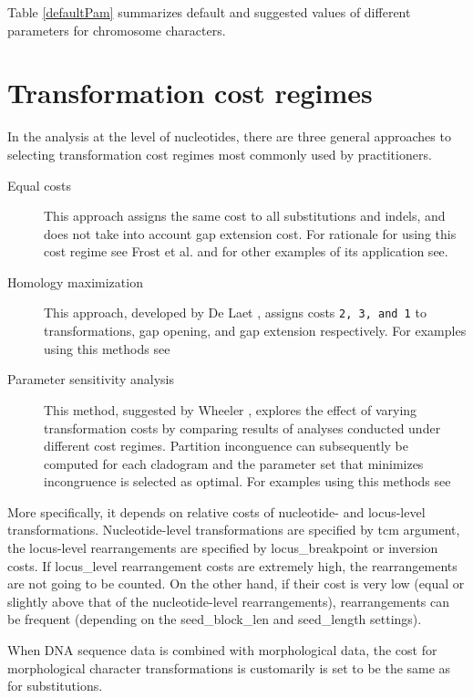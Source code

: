 Table \ref{defaultPam} summarizes default and suggested values of different
parameters for chromosome characters.


\section{Transformation cost regimes}
In the analysis at the level of nucleotides, there are three general approaches to selecting transformation cost regimes most commonly used by \poy practitioners.
\begin{description}
\item[Equal costs] This approach assigns the same cost to all substitutions and indels, and does not take into account gap extension cost. For rationale for using this cost regime see Frost et al. \cite{frost2001} and for other examples of its application see.
\item[Homology maximization] This approach, developed by De Laet \cite{delaet2005}, assigns costs \texttt{2, 3, and 1} to transformations, gap opening, and gap extension respectively. For examples using this methods see
\item[Parameter sensitivity analysis] This method, suggested by Wheeler \cite{wheeler1995}, explores the effect of varying transformation costs by comparing results of analyses conducted under different cost regimes. Partition inconguence can subsequently be computed  for each cladogram and the parameter set that minimizes incongruence is selected as optimal. For examples using this methods see
\end{description}
More specifically, it depends on relative costs of nucleotide- and locus-level transformations. Nucleotide-level transformations are specified by tcm argument, the locus-level rearrangements are specified by locus\_breakpoint or inversion costs. If locus\_level rearrangement costs are extremely high, the rearrangements are not going to be counted. On the other hand, if their cost is very low (equal or slightly above that of the nucleotide-level rearrangements), rearrangements can be frequent (depending on the seed\_block\_len and seed\_length settings).

When DNA sequence data is combined with morphological data, the cost for morphological character transformations is customarily is set to be the same as for substitutions.


